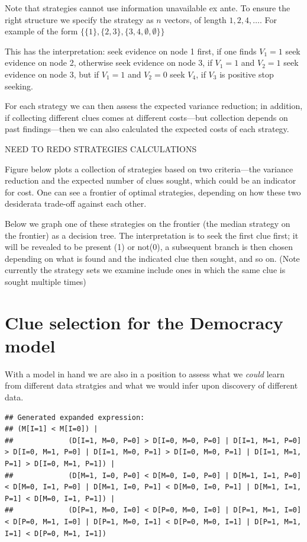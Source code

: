 \documentclass[12pt,]{book}
\begin{document}
Note that strategies cannot use information unavailable ex ante. To ensure the right structure we specify the strategy as \(n\) vectors, of length \(1, 2, 4, \dots\). For example of the form \(\{\{1\}, \{2,3\}, \{3, 4, \emptyset, \emptyset\}\}\)

This has the interpretation: seek evidence on node 1 first, if one finds \(V_1=1\) seek evidence on node 2, otherwise seek evidence on node 3, if \(V_1=1\) and \(V_2=1\) seek evidence on node 3, but if \(V_1=1\) and \(V_2=0\) seek \(V_4\), if \(V_3\) is positive stop seeking.

For each strategy we can then assess the expected variance reduction; in addition, if collecting different clues comes at different costs---but collection depends on past findings---then we can also calculated the expected costs of each strategy.

NEED TO REDO STRATEGIES CALCULATIONS

Figure below plots a collection of strategies based on two criteria---the variance reduction and the expected number of clues sought, which could be an indicator for cost. One can see a frontier of optimal strategies, depending on how these two desiderata trade-off against each other.

Below we graph one of these strategies on the frontier (the median strategy on the frontier) as a decision tree. The interpretation is to seek the first clue first; it will be revealed to be present (1) or not(0), a subsequent branch is then chosen depending on what is found and the indicated clue then sought, and so on. (Note currently the strategy sets we examine include ones in which the same clue is sought multiple times)

\hypertarget{clue-selection-for-the-democracy-model}{%
\section{Clue selection for the Democracy model}\label{clue-selection-for-the-democracy-model}}

With a model in hand we are also in a position to assess what we \emph{could} learn from different data stratgies and what we would infer upon discovery of different data.

\begin{verbatim}
## Generated expanded expression:
## (M[I=1] < M[I=0]) |
##             (D[I=1, M=0, P=0] > D[I=0, M=0, P=0] | D[I=1, M=1, P=0] > D[I=0, M=1, P=0] | D[I=1, M=0, P=1] > D[I=0, M=0, P=1] | D[I=1, M=1, P=1] > D[I=0, M=1, P=1]) |
##             (D[M=1, I=0, P=0] < D[M=0, I=0, P=0] | D[M=1, I=1, P=0] < D[M=0, I=1, P=0] | D[M=1, I=0, P=1] < D[M=0, I=0, P=1] | D[M=1, I=1, P=1] < D[M=0, I=1, P=1]) | 
##             (D[P=1, M=0, I=0] < D[P=0, M=0, I=0] | D[P=1, M=1, I=0] < D[P=0, M=1, I=0] | D[P=1, M=0, I=1] < D[P=0, M=0, I=1] | D[P=1, M=1, I=1] < D[P=0, M=1, I=1])
\end{verbatim}
\end{document}
